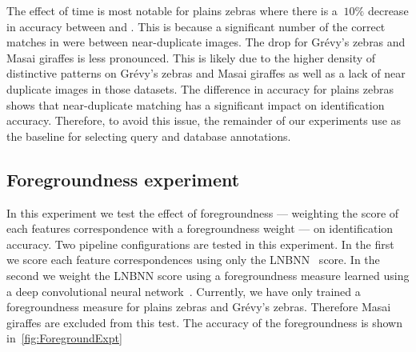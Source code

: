         \BaselineExpt{}

        \begin{comment}
        python -m ibeis -e print --db PZ_Master1 -a ctrl timectrl -t baseline  
        python -m ibeis -e print --db GZ_Master1 -a ctrl timectrl -t baseline  
        python -m ibeis -e print --db GIRM_Master1 -a ctrl timectrl1h -t baseline  
        \end{comment}
        The effect of time is most notable for plains zebras where there is a $~10\percent$ decrease in accuracy
          between \ctrl{} and \timectrl{}.
        This is because a significant number of the correct matches in \ctrl{} were between near-duplicate
          images.
        The drop for Grévy's zebras and Masai giraffes is less pronounced.
        This is likely due to the higher density of distinctive patterns on Grévy's zebras and Masai giraffes as
          well as a lack of near duplicate images in those datasets.
        The difference in accuracy for plains zebras shows that near-duplicate matching has a significant impact
          on identification accuracy.
        Therefore, to avoid this issue, the remainder of our experiments use \timectrl{} as the baseline for
          selecting query and database annotations.

    \subsection{Foregroundness experiment}\label{sub:exptfeatmatchscore}

    \ForegroundExpt{}

        In this experiment we test the effect of foregroundness --- weighting the score of each features
          correspondence with a foregroundness weight --- on identification accuracy.
        Two pipeline configurations are tested in this experiment.
        In the first we score each feature correspondences using only the LNBNN~\cite{mccann_local_2012} score.
        In the second we weight the LNBNN score using a foregroundness measure learned using a deep convolutional
          neural network~\cite{parham_photographic_2015}.
        Currently, we have only trained a foregroundness measure for plains zebras and Grévy's zebras.
        Therefore Masai giraffes are excluded from this test.
        The accuracy of the foregroundness is shown in~\cref{fig:ForegroundExpt}

